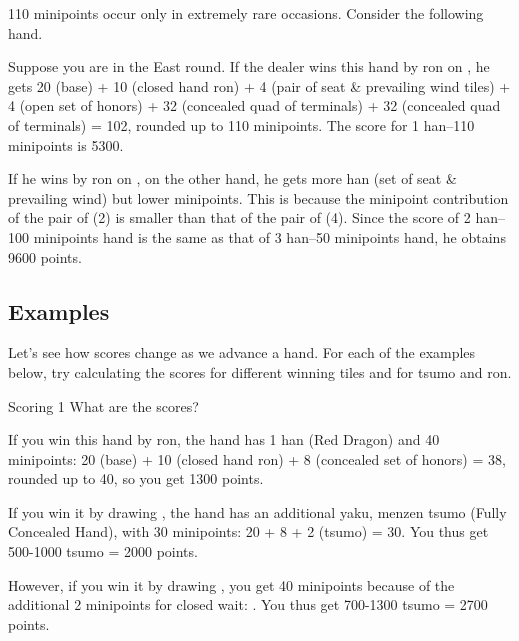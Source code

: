 110 minipoints occur only in extremely rare occasions. Consider the following hand. 
\bp
{}\dong\dong\zhong\zhong~~~
\ep

\bigskip
Suppose you are in the East round. If the dealer wins this hand by {\jap ron} on {\LARGE\zhong}, he gets 20 (base) + 10 (closed hand {\jap ron}) + 4 (pair of seat \& prevailing wind tiles) + 4 (open set of honors) + 32 (concealed quad of terminals) + 32 (concealed quad of terminals) = 102, rounded up to 110 minipoints. The score for 1 {\jap han}--110 minipoints is 5300. 

\bigskip
If he wins by {\jap ron} on {\LARGE\dong}, on the other hand, he gets more {\jap han} (set of seat \& prevailing wind) but lower minipoints. This is because the minipoint contribution of the pair of {\LARGE\zhong} (2) is smaller than that of the pair of {\LARGE\dong} (4). Since the score of 2 {\jap han}--100 minipoints hand is the same as that of 3 {\jap han}--50 minipoints hand, he obtains 9600 points.

\bigskip
\subsection{Examples}

Let's see how scores change as we advance a hand. For each of the examples below, try calculating the scores for different winning tiles and for {\jap tsumo} and {\jap ron}. 

\bigskip
\begin{itembox}[r]{Scoring 1}
\bp
{}\zhong\zhong\zhong
\ep
\vspace{-5pt} What are the scores?
\end{itembox}

\bigskip
If you win this hand by {\jap ron}, the hand has 1 {\jap han} (Red Dragon) and 40 minipoints: 20 (base) + 10 (closed hand {\jap ron}) + 8 (concealed set of honors) = 38, rounded up to 40, so you get 1300 points. 

\bigskip
If you win it by drawing {\LARGE{}}, the hand has an additional {\jap yaku}, {\jap menzen tsumo} (Fully Concealed Hand), with 30 minipoints: 20 + 8 + 2 ({\jap tsumo}) = 30. You thus get 500-1000 {\jap tsumo} = 2000 points. 

\bigskip
However, if you win it by drawing {\LARGE{}}, you get 40 minipoints because of the additional 2 minipoints for closed wait: {\LARGE{}}. You thus get 700-1300 {\jap tsumo} = 2700 points.

